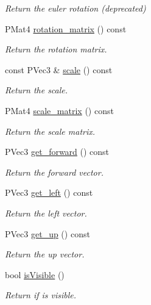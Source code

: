 \begin{DoxyCompactItemize}
\begin{DoxyCompactList}\small\item\em Return the euler rotation (deprecated) \end{DoxyCompactList}\item 
P\+Mat4 \mbox{\hyperlink{classprz_1_1_transform_a9f87cc22d525150beebf1b5bf7e33393}{rotation\+\_\+matrix}} () const
\begin{DoxyCompactList}\small\item\em Return the rotation matrix. \end{DoxyCompactList}\item 
const P\+Vec3 \& \mbox{\hyperlink{classprz_1_1_transform_acf642384c1d8db9ac6adf2cf7ac0ea86}{scale}} () const
\begin{DoxyCompactList}\small\item\em Return the scale. \end{DoxyCompactList}\item 
P\+Mat4 \mbox{\hyperlink{classprz_1_1_transform_a0d906dd2cccb1207304c09cbeb9da99d}{scale\+\_\+matrix}} () const
\begin{DoxyCompactList}\small\item\em Return the scale matrix. \end{DoxyCompactList}\item 
P\+Vec3 \mbox{\hyperlink{classprz_1_1_transform_ae3b522803756c21b856cc4dba3b6419f}{get\+\_\+forward}} () const
\begin{DoxyCompactList}\small\item\em Return the forward vector. \end{DoxyCompactList}\item 
P\+Vec3 \mbox{\hyperlink{classprz_1_1_transform_ac9d9a4e551e2777d36a32817e953ac94}{get\+\_\+left}} () const
\begin{DoxyCompactList}\small\item\em Return the left vector. \end{DoxyCompactList}\item 
P\+Vec3 \mbox{\hyperlink{classprz_1_1_transform_a4f92c2dccb1af841857930395711906d}{get\+\_\+up}} () const
\begin{DoxyCompactList}\small\item\em Return the up vector. \end{DoxyCompactList}\item 
bool \mbox{\hyperlink{classprz_1_1_transform_ac455a3f32172f648099c178cddd6880f}{is\+Visible}} ()
\begin{DoxyCompactList}\small\item\em Return if is visible. \end{DoxyCompactList}\end{DoxyCompactItemize}
